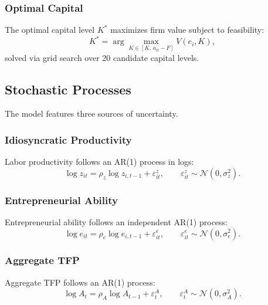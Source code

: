 \documentclass[12pt]{article}
\begin{document}
\subsubsection{Optimal Capital}

The optimal capital level $K^*$ maximizes firm value subject to feasibility:
\begin{equation}\label{eq:optimal_capital}
  K^* = \arg\max_{K \in [\underline{K}, \, a_{it} - F]} V(e_i, K),
\end{equation}
solved via grid search over 20 candidate capital levels.


\subsection{Stochastic Processes}\label{sec:shocks}

The model features three sources of uncertainty.

\subsubsection{Idiosyncratic Productivity}

Labor productivity follows an AR(1) process in logs:
\begin{equation}\label{eq:ar1_z}
  \log z_{it} = \rho_z \log z_{i,t-1} + \varepsilon_{it}^z, \qquad \varepsilon_{it}^z \sim \mathcal{N}(0, \sigma_z^2).
\end{equation}

\subsubsection{Entrepreneurial Ability}

Entrepreneurial ability follows an independent AR(1) process:
\begin{equation}\label{eq:ar1_e}
  \log e_{it} = \rho_e \log e_{i,t-1} + \varepsilon_{it}^e, \qquad \varepsilon_{it}^e \sim \mathcal{N}(0, \sigma_e^2).
\end{equation}

\subsubsection{Aggregate TFP}

Aggregate TFP follows an AR(1) process:
\begin{equation}\label{eq:ar1_A}
  \log A_t = \rho_A \log A_{t-1} + \varepsilon_t^A, \qquad \varepsilon_t^A \sim \mathcal{N}(0, \sigma_A^2).
\end{equation}
\end{document}
